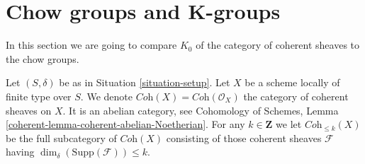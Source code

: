 \section{Chow groups and K-groups}
\label{section-chow-and-K}

\noindent
In this section we are going to compare $K_0$ of the
category of coherent sheaves to the chow groups.

\medskip\noindent
Let $(S, \delta)$ be as in Situation \ref{situation-setup}.
Let $X$ be a scheme locally of finite type over $S$.
We denote $\textit{Coh}(X) = \textit{Coh}(\mathcal{O}_X)$
the category of coherent sheaves on $X$.
It is an abelian category, see
Cohomology of Schemes, Lemma \ref{coherent-lemma-coherent-abelian-Noetherian}.
For any $k \in \mathbf{Z}$ we let $\textit{Coh}_{\leq k}(X)$
be the full subcategory of $\textit{Coh}(X)$
consisting of those coherent sheaves $\mathcal{F}$
having $\dim_\delta(\text{Supp}(\mathcal{F})) \leq k$.

